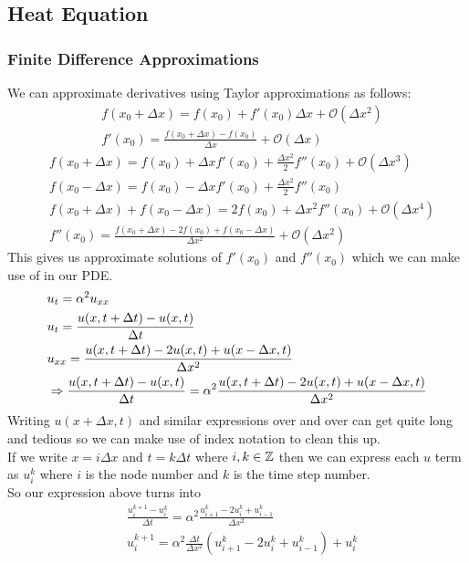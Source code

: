 \documentclass[11pt, fleqn]{article}
\begin{document}
\subsection{Heat Equation}
\subsubsection{Finite Difference Approximations}
We can approximate derivatives using Taylor approximations as follows:
\begin{align*}
    &f(x_0+\Delta x)=f(x_0)+f'(x_0)\Delta x+\mathcal{O}(\Delta x^2)\\
    &f'(x_0)=\frac{f(x_0+\Delta x)-f(x_0)}{\Delta x}+\mathcal{O}(\Delta x)
\end{align*}
\begin{align*}
    &f(x_0+\Delta x)=f(x_0)+\Delta xf'(x_0)+\frac{\Delta x^2}{2}f''(x_0)+\mathcal{O}(\Delta x^3)\\
    &f(x_0-\Delta x)=f(x_0)-\Delta xf'(x_0)+\frac{\Delta x^2}{2}f''(x_0)\\
    &f(x_0+\Delta x)+f(x_0-\Delta x)=2f(x_0)+\Delta x^2f''(x_0)+\mathcal{O}(\Delta x^4)\\
    &f''(x_0)=\frac{f(x_0+\Delta x)-2f(x_0)+f(x_0-\Delta x)}{\Delta x^2}+\mathcal{O}(\Delta x^2)
\end{align*}
This gives us approximate solutions of $f'(x_0)$ and $f''(x_0)$ which we can make use of in our PDE.
\begin{align*}
    &u_t=\alpha^2u_{xx}\\
    &u_t=\frac{u(x,t+\Delta t)-u(x,t)}{\Delta t}\\
    &u_{xx}=\frac{u(x,t+\Delta t)-2u(x,t)+u(x-\Delta x,t)}{\Delta x^2}\\
    &\Rightarrow \frac{u(x,t+\Delta t)-u(x,t)}{\Delta t}=\alpha^2\frac{u(x,t+\Delta t)-2u(x,t)+u(x-\Delta x,t)}{\Delta x^2}
\end{align*}
Writing $u(x+\Delta x,t)$ and similar expressions over and over can get quite long and tedious so we can make use of index notation to clean this up.\\
If we write $x=i\Delta x$ and $t=k\Delta t$ where $i,k\in\mathbb{Z}$ then we can express each $u$ term as $u_i^k$ where $i$ is the node number and $k$ is the time step number.\\
So our expression above turns into
\begin{align*}
    &\frac{u_i^{k+1}-u_i^k}{\Delta t}=\alpha^2\frac{u_{i+1}^k-2u_i^k+u_{i-1}^k}{\Delta x^2}\\
    &u_i^{k+1}=\alpha^2\frac{\Delta t}{\Delta x^2}(u_{i+1}^k-2u_i^k+u_{i-1}^k)+u_i^k
\end{align*}
\end{document}
